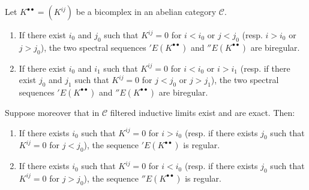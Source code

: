 \begin{proposition}[11.3.3]
\label{0.11.3.3}
Let $K^{\bullet\bullet}=(K^{ij})$ be a bicomplex in an abelian category
$\mathcal C$.
\begin{enumerate}
  \item[(i)] If there exist $i_0$ and $j_0$ such that $K^{ij}=0$ for $i<i_0$ or
    $j<j_0$ (resp. $i>i_0$ or $j>j_0$), the two spectral sequences
    $'E(K^{\bullet\bullet})$ and $''E(K^{\bullet\bullet})$ are
    biregular.
  \item[(ii)] If there exist $i_0$ and $i_1$ such that $K^{ij}=0$ for $i<i_0$ or
    $i>i_1$ (resp. if there exist $j_0$ and $j_1$ such that $K^{ij}=0$ for
    $j<j_0$ or $j>j_1$), the two spectral sequences
    $'E(K^{\bullet\bullet})$ and $''E(K^{\bullet\bullet})$ are
    biregular.
\end{enumerate}
Suppose moreover that in $\mathcal C$ filtered inductive limits
exist and are exact. Then:
\begin{enumerate}
  \item[(iii)] If there exists $i_0$ such that $K^{ij}=0$ for $i>i_0$ (resp. if
    there exists $j_0$ such that $K^{ij}=0$ for $j<j_0$), the sequence
    $'E(K^{\bullet\bullet})$ is regular.
  \item[(iv)] If there exists $i_0$ such that $K^{ij}=0$ for $i<i_0$ (resp. if
    there exists $j_0$ such that $K^{ij}=0$ for $j>j_0$), the sequence
    $''E(K^{\bullet\bullet})$ is regular.
\end{enumerate}
\end{proposition}

